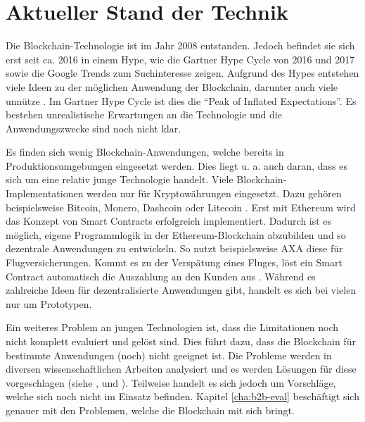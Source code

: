 \chapter{Aktueller Stand der Technik}
\label{cha:stand-technik}

Die Blockchain-Technologie ist im Jahr 2008 entstanden. Jedoch befindet sie sich erst seit ca. 2016 in einem Hype, wie die Gartner Hype Cycle von 2016 und 2017 \cite{PanettaTopTrendsGartner2017}\cite{AmyGartner2016Hype2016} sowie die Google Trends zum Suchinteresse \cite{GoogleBlockchainGoogleTrends18} zeigen. Aufgrund des Hypes entstehen viele Ideen zu der möglichen Anwendung der Blockchain, darunter auch viele unnütze \cite{WustyouneedBlockchain2017}. Im Gartner Hype Cycle ist dies die ``Peak of Inflated Expectations''. Es bestehen unrealistische Erwartungen an die Technologie und die Anwendungszwecke sind noch nicht klar. 

Es finden sich wenig Blockchain-Anwendungen, welche bereits in Produktionsumgebungen eingesetzt werden. Dies liegt u. a. auch daran, dass es sich um eine relativ junge Technologie handelt. Viele Blockchain-Implementationen werden nur für Kryptowährungen eingesetzt. Dazu gehören beispielsweise Bitcoin, Monero, Dashcoin oder Litecoin \cite{BlockchainHubBlockchainsDistributedLedger}. Erst mit Ethereum wird das Konzept von Smart Contracts erfolgreich implementiert. Dadurch ist es möglich, eigene Programmlogik in der Ethereum-Blockchain abzubilden und so dezentrale Anwendungen zu entwickeln. So nutzt beispielsweise AXA diese für Flugversicherungen. Kommt es zu der Verspätung eines Fluges, löst ein Smart Contract automatisch die Auszahlung an den Kunden aus \cite{BoerAXAnutztEthereumBlockchain2017}. Während es zahlreiche Ideen für dezentralisierte Anwendungen gibt, handelt es sich bei vielen nur um Prototypen.

Ein weiteres Problem an jungen Technologien ist, dass die Limitationen noch nicht komplett evaluiert und gelöst sind. Dies führt dazu, dass die Blockchain für bestimmte Anwendungen (noch) nicht geeignet ist. Die Probleme werden in diversen wissenschaftlichen Arbeiten analysiert und es werden Lösungen für diese vorgeschlagen (siehe \cite{ZhengBlockchainChallengesOpportunities2017}, \cite[S.~84]{SwanBlockchainblueprintnew2015} und \cite{SchererPerformanceScalabilityBlockchain2017}). Teilweise handelt es sich jedoch um Vorschläge, welche sich noch nicht im Einsatz befinden. Kapitel \ref{cha:b2b-eval} beschäftigt sich genauer mit den Problemen, welche die Blockchain mit sich bringt.


